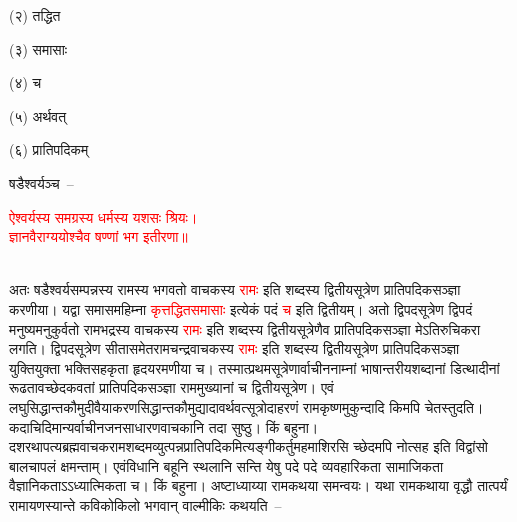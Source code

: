 \begin{sloppypar}\justifying\noindent\hspace{10mm} (२) तद्धित\end{sloppypar}
\begin{sloppypar}\justifying\noindent\hspace{10mm} (३) समासाः\end{sloppypar}
\begin{sloppypar}\justifying\noindent\hspace{10mm} (४) च\end{sloppypar}
\begin{sloppypar}\justifying\noindent\hspace{10mm} (५) अर्थवत्\end{sloppypar}
\begin{sloppypar}\justifying\noindent\hspace{10mm} (६) प्रातिपदिकम् \end{sloppypar}
\begin{sloppypar}\justifying\noindent षडैश्वर्यञ्च~–\end{sloppypar}
\centering\textcolor{red}{ऐश्वर्यस्य समग्रस्य धर्मस्य यशसः श्रियः। \nopagebreak\\
ज्ञानवैराग्ययोश्चैव षण्णां भग इतीरणा॥}\nopagebreak\\
\\
\begin{sloppypar}\justifying\noindent अतः षडैश्वर्य\-सम्पन्नस्य रामस्य भगवतो वाचकस्य \textcolor{red}{रामः} इति शब्दस्य द्वितीय\-सूत्रेण प्रातिपदिक\-सञ्ज्ञा करणीया। यद्वा समास\-महिम्ना \textcolor{red}{कृत्तद्धित\-समासाः} इत्येकं पदं \textcolor{red}{च} इति द्वितीयम्। अतो द्विपद\-सूत्रेण द्विपदं मनुष्यमनुकुर्वतो रामभद्रस्य वाचकस्य \textcolor{red}{रामः} इति शब्दस्य द्वितीय\-सूत्रेणैव प्रातिपदिक\-सञ्ज्ञा मेऽतिरुचि\-करा लगति। द्विपद\-सूत्रेण सीता\-समेत\-रामचन्द्र\-वाचकस्य \textcolor{red}{रामः} इति शब्दस्य द्वितीय\-सूत्रेण प्रातिपदिक\-सञ्ज्ञा युक्ति\-युक्ता भक्ति\-सहकृता हृदय\-रमणीया च। तस्मात्प्रथम\-सूत्रेणार्वाचीन\-नाम्नां भाषान्तरीय\-शब्दानां डित्थादीनां रूढतावच्छेदकवतां प्रातिपदिक\-सञ्ज्ञा राम\-मुख्यानां च द्वितीय\-सूत्रेण। एवं लघु\-सिद्धान्त\-कौमुदी\-वैयाकरण\-सिद्धान्त\-कौमुद्यादावर्थवत्सूत्रोदाहरणं राम\-कृष्ण\-मुकुन्दादि किमपि चेतस्तुदति। कदाचिदिमान्यर्वाचीन\-जन\-साधारण\-वाचकानि तदा सुष्ठु। किं बहुना। दशरथापत्य\-ब्रह्म\-वाचक\-राम\-शब्दमव्युत्पन्न\-प्रातिपदिकमित्यङ्गीकर्तुमहमाशिरसि च्छेदमपि नोत्सह इति विद्वांसो बाल\-चापलं क्षमन्ताम्। एवं\-विधानि बहूनि स्थलानि सन्ति येषु पदे पदे व्यवहारिकता सामाजिकता वैज्ञानिकताऽऽध्यात्मिकता च। किं बहुना। अष्टाध्याय्या राम\-कथया समन्वयः। यथा राम\-कथाया वृद्धौ तात्पर्यं रामायणस्यान्ते कवि\-कोकिलो भगवान् वाल्मीकिः कथयति~–\end{sloppypar}
